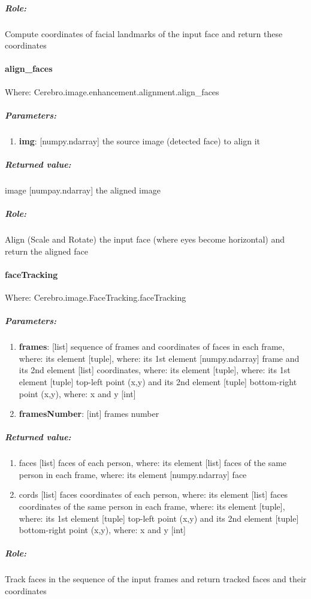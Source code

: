 \subparagraph{Role:}
\begin{changemargin}{1cm}{0cm}
	Compute coordinates of facial landmarks of the input face and return these coordinates
\end{changemargin}

\paragraph{align\_faces}
Where: Cerebro.image.enhancement.alignment.align\_faces
\subparagraph{Parameters:}
\begin{changemargin}{0.5cm}{0cm}
	\begin{enumerate} 
		\item \textbf{img}: [numpy.ndarray] the source image (detected face) to align it
	\end{enumerate}
\end{changemargin}

\subparagraph{Returned value:}
\begin{changemargin}{1cm}{0cm}
	image [numpay.ndarray] the aligned image
\end{changemargin}

\subparagraph{Role:}
\begin{changemargin}{1cm}{0cm}
	Align (Scale and Rotate) the input face (where eyes become horizontal) and return the aligned face
\end{changemargin}

\paragraph{faceTracking}
Where: Cerebro.image.FaceTracking.faceTracking
\subparagraph{Parameters:}
\begin{changemargin}{0.5cm}{0cm}
	\begin{enumerate} 
		\item \textbf{frames}: [list] sequence of frames and coordinates of faces in each frame, where: its element [tuple], where: its 1st element [numpy.ndarray] frame and its 2nd element [list] coordinates, where: its element [tuple], where: its 1st element [tuple] top-left point (x,y) and its 2nd element [tuple] bottom-right point (x,y), where: x and y [int]
		\item \textbf{framesNumber}: [int] frames number
	\end{enumerate}
\end{changemargin}

\subparagraph{Returned value:}
\begin{changemargin}{1cm}{0cm}
	\begin{enumerate} 
		\item faces [list] faces of each person, where: its element [list] faces of the same person in each frame, where: its element [numpy.ndarray] face
		\item cords [list] faces coordinates of each person, where: its element [list] faces coordinates of the same person in each frame, where: its element [tuple], where: its 1st element [tuple] top-left point (x,y) and its 2nd element [tuple] bottom-right point (x,y), where: x and y [int]
	\end{enumerate}
\end{changemargin}

\subparagraph{Role:}
\begin{changemargin}{1cm}{0cm}
	Track faces in the sequence of the input frames and return tracked faces and their coordinates
\end{changemargin}